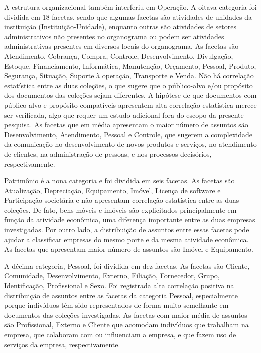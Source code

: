 A estrutura organizacional também interferiu em Operação. A oitava categoria foi dividida em 18 facetas, sendo que algumas facetas são atividades de unidades da instituição (Instituição-Unidade), enquanto outras são atividades de setores administrativos não presentes no organograma ou podem ser atividades administrativas presentes em diversos locais do organograma. As facetas são Atendimento, Cobrança, Compra, Controle, Desenvolvimento, Divulgação, Estoque, Financiamento, Informática, Manutenção, Orçamento, Pessoal, Produto, Segurança, Situação, Suporte à operação, Transporte e Venda. Não há correlação estatística entre as duas coleções, o que sugere que o público-alvo e/ou propósito dos documentos das coleções sejam diferentes. A hipótese de que documentos com público-alvo e propósito compatíveis apresentem alta correlação estatística merece ser verificada, algo que requer um estudo adicional fora do escopo da presente pesquisa. As facetas que em média apresentam o maior número de assuntos são Desenvolvimento, Atendimento, Pessoal e Controle, que sugerem a complexidade da comunicação no desenvolvimento de novos produtos e serviços, no atendimento de clientes, na administração de pessoas, e nos processos decisórios, respectivamente.

Patrimônio é a nona categoria e foi dividida em seis facetas. As facetas são Atualização, Depreciação, Equipamento, Imóvel, Licença de software e Participação societária e não apresentam correlação estatística entre as duas coleções. De fato, bens móveis e imóveis são explicitados principalmente em função da atividade econômica, uma diferença importante entre as duas empresas investigadas. Por outro lado, a distribuição de assuntos entre essas facetas pode ajudar a classificar empresas do mesmo porte e da mesma atividade econômica. As facetas que apresentam maior número de assuntos são Imóvel e Equipamento.

A décima categoria, Pessoal, foi dividida em dez facetas. As facetas são Cliente, Comunidade, Desenvolvimento, Externo, Filiação, Fornecedor, Grupo, Identificação, Profissional e Sexo. Foi registrada alta correlação positiva na distribuição de assuntos entre as facetas da categoria Pessoal, especialmente porque indivíduos têm sido representados de forma muito semelhante em documentos das coleções investigadas. As facetas com maior média de assuntos são Profissional, Externo e Cliente que acomodam indivíduos que trabalham na empresa, que colaboram com ou influenciam a empresa, e que fazem uso de serviços da empresa, respectivamente.

